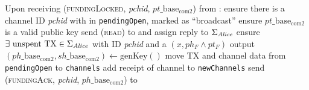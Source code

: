 \begin{algorithmic}[1]
    \State Upon receiving (\textsc{fundingLocked}, \textit{pchid},
    $pt\_\mathrm{base}_{\mathrm{com}2}$) from \bob:
    \Indent
      \State ensure there is a channel ID \textit{pchid} with \bob{} in
      \texttt{pendingOpen}, marked as ``broadcast''
      \State ensure $pt\_\mathrm{base}_{\mathrm{com}2}$ is a valid public key
      \State send (\textsc{read}) to \ledger{} and assign reply to
      $\Sigma_{\mathit{Alice}}$
      \State ensure $\exists \text{ unspent } \mathrm{TX} \in \Sigma_{\mathit{Alice}}$
      with ID \textit{pchid} and a $\left(x, ph_F \wedge pt_F\right)$ output
      \State $\left(ph\_\mathrm{base}_{\mathrm{com}2},
      sh\_\mathrm{base}_{\mathrm{com}2}\right) \gets
      \mathrm{genKey}\left(\right)$
      \State move TX and channel data from \texttt{pendingOpen} to
      \texttt{channels}
      \State add receipt of channel to \texttt{newChannels}
      \State send (\textsc{fundingAck}, \textit{pchid},
      $ph\_\mathrm{base}_{\mathrm{com}2}$) to \bob
    \EndIndent
    \State


\end{algorithmic}
